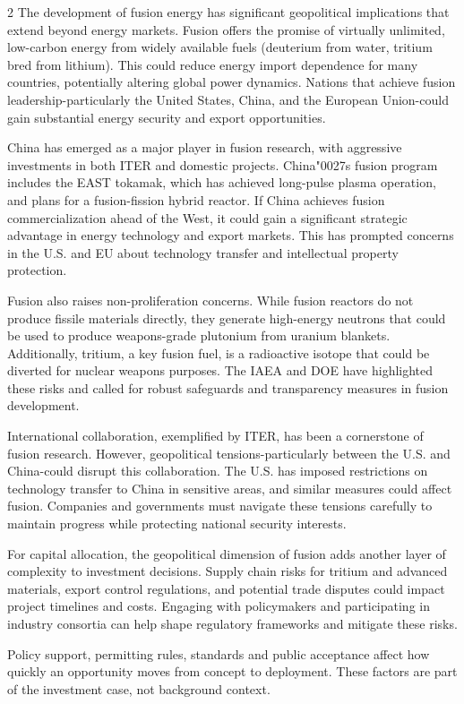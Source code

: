 \documentclass[10pt,a4paper]{article}
\newcommand{\BOApos}{{\BOQuoteFont\char"0027}}
\begin{document}
\begin{multicols}{2}
{\small The development of fusion energy has significant geopolitical implications that extend beyond energy markets. Fusion offers the promise of virtually unlimited, low-carbon energy from widely available fuels (deuterium from water, tritium bred from lithium). This could reduce energy import dependence for many countries, potentially altering global power dynamics. Nations that achieve fusion leadership-particularly the United States, China, and the European Union-could gain substantial energy security and export opportunities.}\par
{\small China has emerged as a major player in fusion research, with aggressive investments in both ITER and domestic projects. China\BOApos{}s fusion program includes the EAST tokamak, which has achieved long-pulse plasma operation, and plans for a fusion-fission hybrid reactor. If China achieves fusion commercialization ahead of the West, it could gain a significant strategic advantage in energy technology and export markets. This has prompted concerns in the U.S. and EU about technology transfer and intellectual property protection.}\par
{\small Fusion also raises non-proliferation concerns. While fusion reactors do not produce fissile materials directly, they generate high-energy neutrons that could be used to produce weapons-grade plutonium from uranium blankets. Additionally, tritium, a key fusion fuel, is a radioactive isotope that could be diverted for nuclear weapons purposes. The IAEA and DOE have highlighted these risks and called for robust safeguards and transparency measures in fusion development.}\par
{\small International collaboration, exemplified by ITER, has been a cornerstone of fusion research. However, geopolitical tensions-particularly between the U.S. and China-could disrupt this collaboration. The U.S. has imposed restrictions on technology transfer to China in sensitive areas, and similar measures could affect fusion. Companies and governments must navigate these tensions carefully to maintain progress while protecting national security interests.}\par
{\small For capital allocation, the geopolitical dimension of fusion adds another layer of complexity to investment decisions. Supply chain risks for tritium and advanced materials, export control regulations, and potential trade disputes could impact project timelines and costs. Engaging with policymakers and participating in industry consortia can help shape regulatory frameworks and mitigate these risks.}\par
{\small Policy support, permitting rules, standards and public acceptance affect how quickly an opportunity moves from concept to deployment. These factors are part of the investment case, not background context.}\par
\end{multicols}
\label{chap:4:end}
\end{document}
